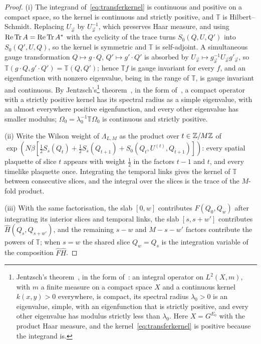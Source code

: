 \begin{proof}
(i) The integrand of~\eqref{eq:transferkernel} is continuous and positive on
a compact space, so the kernel is continuous and strictly positive, and
$\mathbb T$ is Hilbert--Schmidt. Replacing $U_{\vec x}$ by $U_{\vec x}^{-1}$,
which preserves Haar measure, and using $\operatorname{Re}\operatorname{Tr} A=\operatorname{Re}\operatorname{Tr} A^*$ with the
cyclicity of the trace turns $S_0(Q,U,Q')$ into $S_0(Q',U,Q)$, so the kernel
is symmetric and $\mathbb T$ is self-adjoint. A simultaneous gauge
transformation $Q\mapsto g\cdot Q$, $Q'\mapsto g'\cdot Q'$ is absorbed by
$U_{\vec x}\mapsto g_{\vec x}^{-1}U_{\vec x}g'_{\vec x}$, so
$\mathbb T(g\cdot Q,g'\cdot Q')=\mathbb T(Q,Q')$; hence $\mathbb Tf$ is gauge
invariant for every $f$, and an eigenfunction with nonzero eigenvalue, being
in the range of $\mathbb T$, is gauge invariant and continuous. By Jentzsch's\footnote{Jentzsch's
theorem~\cite{Jen12}, in the form of~\cite[Ch.~V, \S6]{Sch74}: an integral
operator on $L^2(X,m)$, with $m$ a finite measure on a compact space $X$ and
a continuous kernel $k(x,y)>0$ everywhere, is compact, its spectral radius
$\lambda_0>0$ is an eigenvalue, simple, with an eigenfunction that is
strictly positive, and every other eigenvalue has modulus strictly less
than $\lambda_0$. Here $X=G^{E_0}$ with the product Haar measure, and the
kernel~\eqref{eq:transferkernel} is positive because the integrand is.}
theorem~\cite{Jen12}, in the form of~\cite[Thm.~V.6.6]{Sch74}, a compact
operator with a strictly positive kernel has its spectral radius as a simple
eigenvalue, with an almost everywhere positive eigenfunction, and every other
eigenvalue has smaller modulus; $\Omega_0=\lambda_0^{-1}\mathbb T\Omega_0$ is
continuous and strictly positive.

(ii) Write the Wilson weight of $\Lambda_{L,M}$ as the product over $t\in\mathbb{Z}/M\mathbb{Z}$
of $\exp(N\beta[\frac12S_s(Q_t)+\frac12S_s(Q_{t+1})+S_0(Q_t,U^{(t)},Q_{t+1})])$:
every spatial plaquette of slice $t$ appears with weight $\frac12$ in the
factors $t-1$ and $t$, and every timelike plaquette once. Integrating the
temporal links gives the kernel of $\mathbb T$ between consecutive slices, and
the integral over the slices is the trace of the $M$-fold product.

(iii) With the same factorisation, the slab $[0,w]$ contributes
$\hat F(Q_0,Q_w)$ after integrating its interior slices and temporal links,
the slab $[s,s+w']$ contributes $\hat H(Q_s,Q_{s+w'})$, and the remaining
$s-w$ and $M-s-w'$ factors contribute the powers of $\mathbb T$; when $s=w$
the shared slice $Q_w=Q_s$ is the integration variable of the composition
$\hat F\hat H$.


\end{proof}
